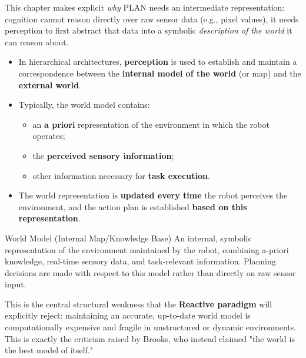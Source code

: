 This chapter makes explicit \textit{why} PLAN needs an intermediate representation: cognition cannot reason directly over raw sensor data (e.g., pixel values), it needs perception to first abstract that data into a symbolic \textit{description of the world} it can reason about. 


\begin{itemize}
    \item In hierarchical architectures, \textbf{perception} is used to establish and maintain a correspondence between the \textbf{internal model of the world} (or map) and the \textbf{external world}.
    \item Typically, the world model contains:
    \begin{itemize}
        \item an \textbf{a priori} representation of the environment in which the robot operates;
        \item the \textbf{perceived sensory information};
        \item other information necessary for \textbf{task execution}.
    \end{itemize}
    \item The world representation is \textbf{updated every time} the robot perceives the environment, and the action plan is established \textbf{based on this representation}.
\end{itemize}

\begin{defbox}{World Model (Internal Map/Knowledge Base)}
An internal, symbolic representation of the environment maintained by the robot, combining a-priori knowledge, real-time sensory data, and task-relevant information. Planning decisions are made with respect to this model rather than directly on raw sensor input.
\end{defbox}

This is the central structural weakness that the \textbf{Reactive paradigm}  will explicitly reject: maintaining an accurate, up-to-date world model is computationally expensive and fragile in unstructured or dynamic environments. This is exactly the criticism raised by Brooks, who instead claimed "the world is the best model of itself."

